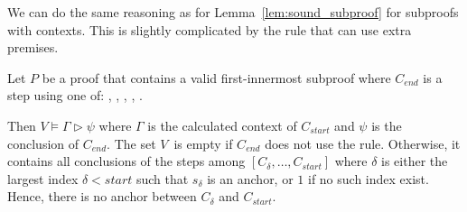 \documentclass{scrartcl}
\begin{document}
\noindent
We can do the same reasoning as for Lemma~\ref{lem:sound_subproof} for
subproofs with contexts.  This is slightly complicated by the
 rule that can use extra premises.

\begin{lemma}\label{lem:sound_subproof_context}
  Let $P$ be a proof that contains a
  valid first-innermost subproof where
  $C_{\mathit{end}}$ is a step using one of:
  , , ,
  , .

  Then $V \vDash \Gamma \vartriangleright \psi$ where $\Gamma$ is the
  calculated context of $C_{\mathit{start}}$ and $\psi$ is the conclusion
  of $C_{\mathit{end}}$.  The set $V$\, is empty if $C_{\mathit{end}}$
  does not use the  rule.  Otherwise, it contains all
  conclusions of the
   steps among $[C_{δ}, \dots,
  C_{\mathit{start}}]$ where $δ$ is either the largest index
  $δ < {\mathit{start}}$ such
  that $s_{δ}$ is an anchor, or $1$ if no such index exist.
  Hence, there is no anchor between $C_{δ}$ and $C_{\mathit{start}}$.
\end{lemma}
\end{document}
